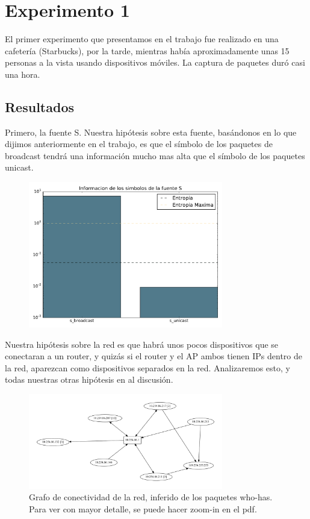 \section{Experimento 1}

El primer experimento que presentamos en el trabajo fue realizado en una cafetería (Starbucks), por la tarde, mientras había aproximadamente unas 15 personas a la vista usando dispositivos móviles. La captura de paquetes duró casi una hora.

\subsection{Resultados}

Primero, la fuente S. Nuestra hipótesis sobre esta fuente, basándonos en lo que dijimos anteriormente en el trabajo, es que el símbolo de los paquetes de broadcast tendrá una información mucho mas alta que el símbolo de los paquetes unicast.

\begin{figure}[H]
  \centering
  \includegraphics[width=8.5cm]{exp_starbucks/grafico1.pdf}
  \caption{\normalfont }
\end{figure}

Nuestra hipótesis sobre la red es que habrá unos pocos dispositivos que se conectaran a un router, y quizás si el router y el AP ambos tienen IPs dentro de la red, aparezcan como dispositivos separados en la red.
Analizaremos esto, y todas nuestras otras hipótesis en al discusión.

\begin{figure}[H]
  \centering
  \includegraphics[width=8.5cm]{exp_starbucks/grafico2.pdf}
  \caption{  \normalfont Grafo de conectividad de la red, inferido de los paquetes who-has. Para ver con mayor detalle, se puede hacer zoom-in en el pdf. }
\end{figure}

